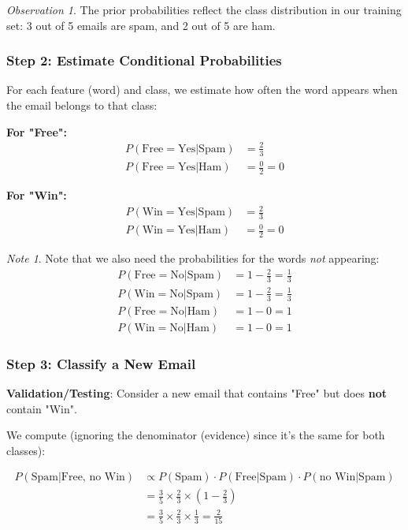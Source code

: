 \documentclass[11pt,a4paper]{article}
\theoremstyle{definition}
\theoremstyle{plain}
\theoremstyle{remark}
\newtheorem*{remark}{Note}
\newtheorem*{observation}{Observation}
\begin{document}
\begin{observation}
The prior probabilities reflect the class distribution in our training set: 3 out of 5 emails are spam, and 2 out of 5 are ham.
\end{observation}

\subsubsection{Step 2: Estimate Conditional Probabilities}

For each feature (word) and class, we estimate how often the word appears when the email belongs to that class:

\textbf{For "Free":}
\begin{align}
P(\text{Free} = \text{Yes} | \text{Spam}) &= \frac{2}{3} \\
P(\text{Free} = \text{Yes} | \text{Ham}) &= \frac{0}{2} = 0
\end{align}

\textbf{For "Win":}
\begin{align}
P(\text{Win} = \text{Yes} | \text{Spam}) &= \frac{2}{3} \\
P(\text{Win} = \text{Yes} | \text{Ham}) &= \frac{0}{2} = 0
\end{align}

\begin{remark}
Note that we also need the probabilities for the words \textit{not} appearing:
\begin{align*}
P(\text{Free} = \text{No} | \text{Spam}) &= 1 - \frac{2}{3} = \frac{1}{3} \\
P(\text{Win} = \text{No} | \text{Spam}) &= 1 - \frac{2}{3} = \frac{1}{3} \\
P(\text{Free} = \text{No} | \text{Ham}) &= 1 - 0 = 1 \\
P(\text{Win} = \text{No} | \text{Ham}) &= 1 - 0 = 1
\end{align*}
\end{remark}

\subsubsection{Step 3: Classify a New Email}

\textbf{Validation/Testing}: Consider a new email that contains "Free" but does \textbf{not} contain "Win".

We compute (ignoring the denominator (evidence) since it's the same for both classes):

\begin{align}
P(\text{Spam} | \text{Free, no Win}) &\propto P(\text{Spam}) \cdot P(\text{Free}|\text{Spam}) \cdot P(\text{no Win}|\text{Spam}) \\
&= \frac{3}{5} \times \frac{2}{3} \times \left(1 - \frac{2}{3}\right) \\
&= \frac{3}{5} \times \frac{2}{3} \times \frac{1}{3} = \frac{2}{15}
\end{align}
\end{document}

